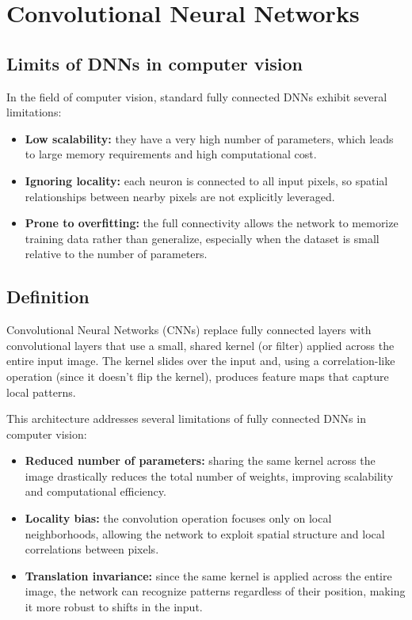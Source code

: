 \section{Convolutional Neural Networks}

\subsection{Limits of DNNs in computer vision}
In the field of computer vision, standard fully connected DNNs exhibit several limitations:
\begin{itemize}
    \item \textbf{Low scalability:} they have a very high number of parameters, which leads to large memory requirements and high computational cost.
    \item \textbf{Ignoring locality:} each neuron is connected to all input pixels, so spatial relationships between nearby pixels are not explicitly leveraged.
    \item \textbf{Prone to overfitting:} the full connectivity allows the network to memorize training data rather than generalize, especially when the dataset is small relative to the number of parameters.
\end{itemize}

\subsection{Definition}
Convolutional Neural Networks (CNNs) replace fully connected layers with convolutional layers that use a small, shared kernel (or filter) applied across the entire input image.  
The kernel slides over the input and, using a correlation-like operation (since it doesn't flip the kernel), produces feature maps that capture local patterns.  

This architecture addresses several limitations of fully connected DNNs in computer vision:  
\begin{itemize}
    \item \textbf{Reduced number of parameters:} sharing the same kernel across the image drastically reduces the total number of weights, improving scalability and computational efficiency.
    \item \textbf{Locality bias:} the convolution operation focuses only on local neighborhoods, allowing the network to exploit spatial structure and local correlations between pixels.
    \item \textbf{Translation invariance:} since the same kernel is applied across the entire image, the network can recognize patterns regardless of their position, making it more robust to shifts in the input.
\end{itemize}

